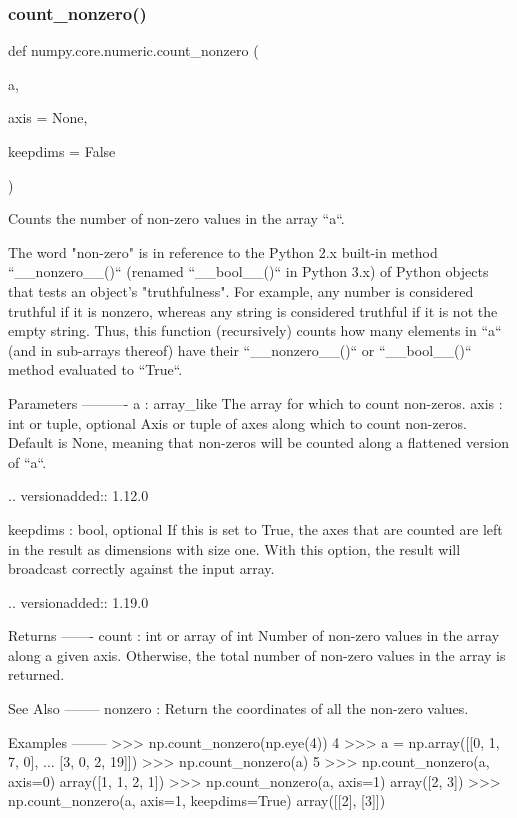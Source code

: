 \subsubsection{\texorpdfstring{count\+\_\+nonzero()}{count\_nonzero()}}
{\footnotesize\ttfamily def numpy.\+core.\+numeric.\+count\+\_\+nonzero (\begin{DoxyParamCaption}\item[{}]{a,  }\item[{}]{axis = {\ttfamily None},  }\item[{}]{keepdims = {\ttfamily False} }\end{DoxyParamCaption})}

\begin{DoxyVerb}Counts the number of non-zero values in the array ``a``.

The word "non-zero" is in reference to the Python 2.x
built-in method ``__nonzero__()`` (renamed ``__bool__()``
in Python 3.x) of Python objects that tests an object's
"truthfulness". For example, any number is considered
truthful if it is nonzero, whereas any string is considered
truthful if it is not the empty string. Thus, this function
(recursively) counts how many elements in ``a`` (and in
sub-arrays thereof) have their ``__nonzero__()`` or ``__bool__()``
method evaluated to ``True``.

Parameters
----------
a : array_like
    The array for which to count non-zeros.
axis : int or tuple, optional
    Axis or tuple of axes along which to count non-zeros.
    Default is None, meaning that non-zeros will be counted
    along a flattened version of ``a``.

    .. versionadded:: 1.12.0

keepdims : bool, optional
    If this is set to True, the axes that are counted are left
    in the result as dimensions with size one. With this option,
    the result will broadcast correctly against the input array.

    .. versionadded:: 1.19.0

Returns
-------
count : int or array of int
    Number of non-zero values in the array along a given axis.
    Otherwise, the total number of non-zero values in the array
    is returned.

See Also
--------
nonzero : Return the coordinates of all the non-zero values.

Examples
--------
>>> np.count_nonzero(np.eye(4))
4
>>> a = np.array([[0, 1, 7, 0],
...               [3, 0, 2, 19]])
>>> np.count_nonzero(a)
5
>>> np.count_nonzero(a, axis=0)
array([1, 1, 2, 1])
>>> np.count_nonzero(a, axis=1)
array([2, 3])
>>> np.count_nonzero(a, axis=1, keepdims=True)
array([[2],
       [3]])
\end{DoxyVerb}
 \mbox{\label{namespacenumpy_1_1core_1_1numeric_a2002e78dc75a2cc31a1b29af6feee132}} 

